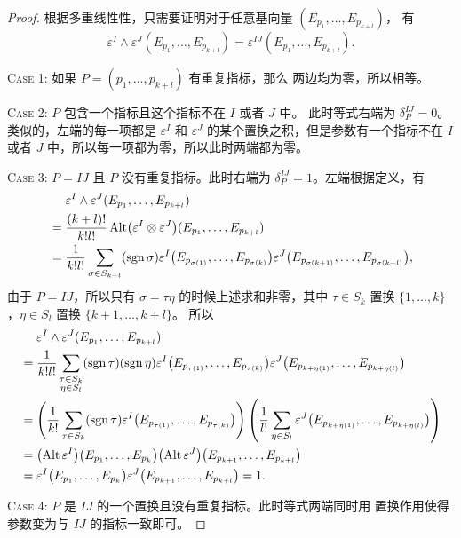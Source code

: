 \begin{proof}
  根据多重线性性，只需要证明对于任意基向量 $(E_{p_1},\dots,E_{p_{k+l}})$，
  有 
  \begin{equation}
    \varepsilon^I\wedge\varepsilon^J(E_{p_1},\dots,E_{p_{k+l}})
    =\varepsilon^{IJ}(E_{p_1},\dots,E_{p_{k+l}}).
  \end{equation}

  \textsc{Case 1:} 如果 $P=(p_1,\dots,p_{k+l})$ 有重复指标，那么
  两边均为零，所以相等。

  \textsc{Case 2:} $P$ 包含一个指标且这个指标不在 $I$ 或者 $J$ 中。
  此时等式右端为 $\delta_P^{IJ}=0$。类似的，左端的每一项都是 $\varepsilon^I$
  和 $\varepsilon^J$ 的某个置换之积，但是参数有一个指标不在 $I$ 或者 $J$
  中，所以每一项都为零，所以此时两端都为零。

  \textsc{Case 3:} $P=IJ$ 且 $P$ 没有重复指标。此时右端为
  $\delta_P^{IJ}=1$。左端根据定义，有
  \begin{align*}
    &\hphantom{{}={}}\varepsilon^I\wedge \varepsilon^J(E_{p_1},\dots,E_{p_{k+l}})\\
    &=\frac{(k+l)!}{k!l!}\Alt\bigl(\varepsilon^I\otimes\varepsilon^J\bigr)
    (E_{p_1},\dots,E_{p_{k+l}})\\
    &=\frac{1}{k!l!}\sum_{\sigma\in S_{k+l}}(\sgn\sigma)
    \varepsilon^I\bigl(E_{p_{\sigma(1)}},\dots,E_{p_{\sigma(k)}}\bigr)
    \varepsilon^J\bigl(E_{p_{\sigma(k+1)}},\dots,E_{p_{\sigma(k+l)}}\bigr),
  \end{align*}
  由于 $P=IJ$，所以只有 $\sigma=\tau\eta$ 的时候上述求和非零，其中
  $\tau\in S_k$ 置换 $\{1,\dots,k\}$，$\eta\in S_l$ 置换 $\{k+1,\dots,k+l\}$。
  所以
  \begin{align*}
    &\hphantom{{}={}}\varepsilon^I\wedge \varepsilon^J(E_{p_1},\dots,E_{p_{k+l}})\\
    &=\frac{1}{k!l!}\sum_{\substack{\tau\in S_k\\\eta\in S_l}}
    (\sgn\tau)(\sgn\eta) \varepsilon^I\bigl(E_{p_{\tau(1)}},\dots,E_{p_{\tau(k)}}\bigr)
    \varepsilon^J\bigl(E_{p_{k+\eta(1)}},\dots,E_{p_{k+\eta(l)}}\bigr)\\
    &=\left(
      \frac{1}{k!}\sum_{\tau\in S_k}(\sgn\tau)
      \varepsilon^I\bigl(E_{p_{\tau(1)}},\dots,E_{p_{\tau(k)}}\bigr)
    \right)\left(
      \frac{1}{l!}\sum_{\eta\in S_l}\varepsilon^J\bigl(E_{p_{k+\eta(1)}},\dots,E_{p_{k+\eta(l)}}\bigr)
    \right)\\
    &=\bigl(\Alt \varepsilon^I\bigr)\bigl(E_{p_{1}},\dots,E_{p_{k}}\bigr)
    \bigl(\Alt \varepsilon^J\bigr)\bigl(E_{p_{k+1}},\dots,E_{p_{k+l}}\bigr)\\
    &=\varepsilon^I\bigl(E_{p_{1}},\dots,E_{p_{k}}\bigr)
    \varepsilon^J\bigl(E_{p_{k+1}},\dots,E_{p_{k+l}}\bigr)=1.
  \end{align*}

  \textsc{Case 4:} $P$ 是 $IJ$ 的一个置换且没有重复指标。此时等式两端同时用
  置换作用使得参数变为与 $IJ$ 的指标一致即可。
\end{proof} 

